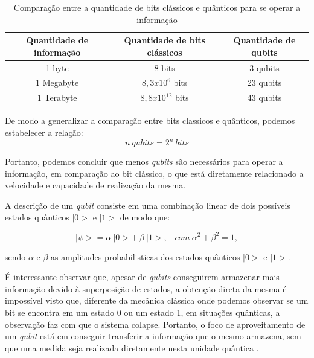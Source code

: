 \documentclass[11pt,oneside,brazil,hidelinks,article,sumario=tradicional,a4paper]{abntex2}
\begin{document}
\begin{table}[ht!]
\centering
\vspace{0.5cm}
\begin{center}
\caption{Comparação entre a quantidade de bits clássicos e quânticos para se operar a informação}\label{tabelabit}
\begin{tabular}{c|c|c}
\hline
Quantidade de informação & Quantidade de bits clássicos & Quantidade de qubits\\
\hline
1 byte & 8 bits & 3 qubits\\
1 Megabyte & $8,3 x 10^{6}$ bits & 23 qubits\\
1 Terabyte & $8,8 x 10^{12}$ bits & 43 qubits \\
\hline
\end{tabular}
\end{center} 
\end{table}

De modo a generalizar a comparação entre bits classicos e quânticos, podemos estabelecer a relação:
\begin{equation} \label{bitvsqubit}
n \ qubits = 2^{n}  \ bits
\end{equation}

Portanto, podemos concluir que menos \textit{qubits} são necessários para operar a informação, em comparação ao bit clássico, o que está diretamente relacionado a velocidade e capacidade de realização da mesma.

A descrição de um \textit{qubit} consiste em uma combinação linear de dois possíveis estados quânticos $|0>$ e $|1>$ de modo que:

\begin{equation} \label{comblinearqubit}
 |\psi> = \alpha \ |0> + \ \beta \ |1>, \; \; \; com \ \alpha^{2} + \beta^{2} = 1,
\end{equation}

sendo $\alpha$ e $\beta$ as amplitudes probabilisticas dos estados quânticos $|0>$ e $|1>$.

É interessante observar que, apesar de \textit{qubits} conseguirem armazenar mais informação devido à superposição de estados, a obtenção direta da mesma é impossível visto que, diferente da mecânica clássica onde podemos observar se um bit se encontra em um estado 0 ou um estado 1, em situações quânticas, a observação faz com que o sistema colapse. Portanto, o foco de aproveitamento de um \textit{qubit} está em conseguir transferir a informação que o mesmo armazena, sem que uma medida seja realizada diretamente nesta unidade quântica \cite{chuang}.
\end{document}
